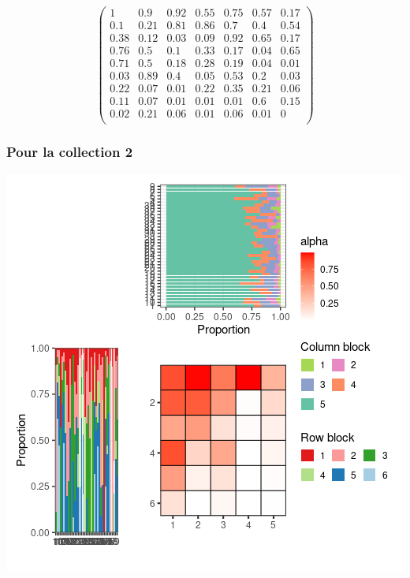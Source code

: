 \normalsize\newline\[\begin{pmatrix} 1 &0.9 &0.92 &0.55 &0.75 &0.57 &0.17 \\0.1 &0.21 &0.81 &0.86 &0.7 &0.4 &0.54 \\0.38 &0.12 &0.03 &0.09 &0.92 &0.65 &0.17 \\0.76 &0.5 &0.1 &0.33 &0.17 &0.04 &0.65 \\0.71 &0.5 &0.18 &0.28 &0.19 &0.04 &0.01 \\0.03 &0.89 &0.4 &0.05 &0.53 &0.2 &0.03 \\0.22 &0.07 &0.01 &0.22 &0.35 &0.21 &0.06 \\0.11 &0.07 &0.01 &0.01 &0.01 &0.6 &0.15 \\0.02 &0.21 &0.06 &0.01 &0.06 &0.01 &0 \\ \end{pmatrix}\]

\subsubsection{Pour la collection 2 }

\includegraphics{./img/66882e0b770527a45b5ba01441cbb86ed71491bd.png}\newline \tiny


